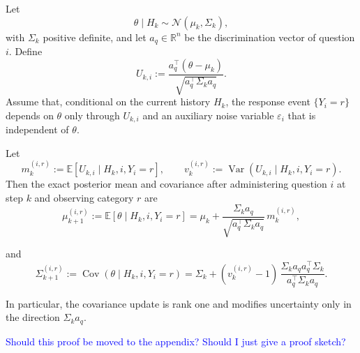 \documentclass{article}
\begin{document}
\begin{prop}\label{prop:rank_one_update}
Let
\begin{equation*}
\theta \mid H_k \sim \mathcal N(\mu_k,\Sigma_k),
\end{equation*}
with $\Sigma_k$ positive definite, and let $a_q\in\mathbb R^n$ be the discrimination vector of
question $i$. Define
\begin{equation*}
U_{k,i}
:=
\frac{a_q^\top(\theta-\mu_k)}{\sqrt{a_q^\top\Sigma_k a_q}}.
\end{equation*}
Assume that, conditional on the current history $H_k$, the response event $\{Y_i=r\}$
depends on $\theta$ only through $U_{k,i}$ and an auxiliary noise variable $\varepsilon_i$
that is independent of $\theta$.

Let
\begin{equation*}
m_{k}^{(i,r)}:=\mathbb E[U_{k,i}\mid H_k,i,Y_i=r],
\qquad
v_{k}^{(i,r)}:=\operatorname{Var}(U_{k,i}\mid H_k,i,Y_i=r).
\end{equation*}
Then the exact posterior mean and covariance after administering question $i$ at step $k$ and
observing category $r$ are
\begin{equation}\label{eq:mu_update}
\mu_{k+1}^{(i,r)}
:=
\mathbb E[\theta\mid H_k,i,Y_i=r]
=
\mu_k+
\frac{\Sigma_k a_q}{\sqrt{a_q^\top\Sigma_k a_q}}\,m_{k}^{(i,r)}, 
\end{equation}


and
\begin{equation}\label{eq:sigma_update}
\Sigma_{k+1}^{(i,r)}
:=
\operatorname{Cov}(\theta\mid H_k,i,Y_i=r)
=
\Sigma_k+
(v_{k}^{(i,r)}-1)\,
\frac{\Sigma_k a_q a_q^\top \Sigma_k}{a_q^\top\Sigma_k a_q}.    
\end{equation}


In particular, the covariance update is rank one and modifies uncertainty only in the direction
$\Sigma_k a_q$.
\end{prop}  \textcolor{blue}{Should this proof be moved to the appendix? Should I just give a proof sketch?}
\end{document}

